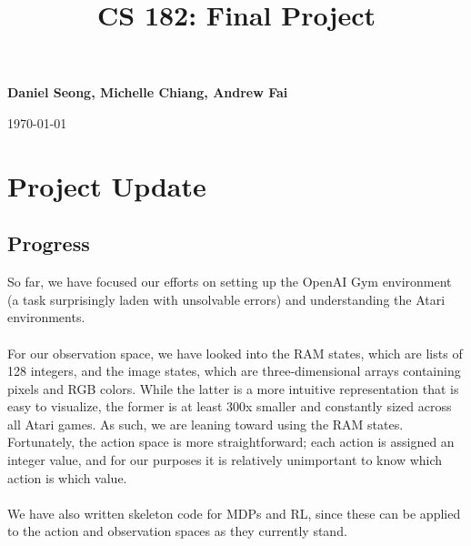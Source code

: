 \documentclass{NSF}
\begin{document}

\title{CS 182: Final Project}
\begin{center}
	{\bf \large Daniel Seong, Michelle Chiang, Andrew Fai}

	\today
\end{center}

\section{Project Update}

\subsection{Progress}
So far, we have focused our efforts on setting up the OpenAI Gym environment (a task surprisingly laden with unsolvable errors) and understanding the Atari environments.
\\\\
For our observation space, we have looked into the RAM states, which are lists of 128 integers, and the image states, which are three-dimensional arrays containing pixels and RGB colors. While the latter is a more intuitive representation that is easy to visualize, the former is at least 300x smaller and constantly sized across all Atari games. As such, we are leaning toward using the RAM states. Fortunately, the action space is more straightforward; each action is assigned an integer value, and for our purposes it is relatively unimportant to know which action is which value.
\\\\
We have also written skeleton code for MDPs and RL, since these can be applied to the action and observation spaces as they currently stand.
\\
\end{document}
